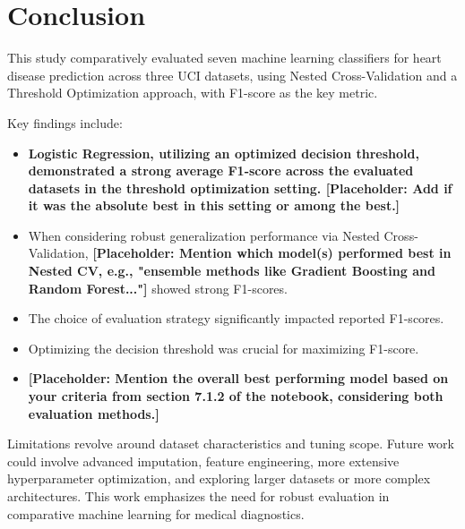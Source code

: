 \documentclass{article}
\begin{document}
\section{Conclusion}
This study comparatively evaluated seven machine learning classifiers for heart disease prediction across three UCI datasets, using Nested Cross-Validation and a Threshold Optimization approach, with F1-score as the key metric.

Key findings include:
\begin{itemize}
    \item \textbf{Logistic Regression, utilizing an optimized decision threshold, demonstrated a strong average F1-score across the evaluated datasets in the threshold optimization setting. \textbf{[Placeholder: Add if it was the absolute best in this setting or among the best.]}}
    \item When considering robust generalization performance via Nested Cross-Validation, \textbf{[Placeholder: Mention which model(s) performed best in Nested CV, e.g., "ensemble methods like Gradient Boosting and Random Forest..."]} showed strong F1-scores.
    \item The choice of evaluation strategy significantly impacted reported F1-scores.
    \item Optimizing the decision threshold was crucial for maximizing F1-score.
    \item \textbf{[Placeholder: Mention the overall best performing model based on your criteria from section 7.1.2 of the notebook, considering both evaluation methods.]}
\end{itemize}

Limitations revolve around dataset characteristics and tuning scope. Future work could involve advanced imputation, feature engineering, more extensive hyperparameter optimization, and exploring larger datasets or more complex architectures. This work emphasizes the need for robust evaluation in comparative machine learning for medical diagnostics.
\end{document}
